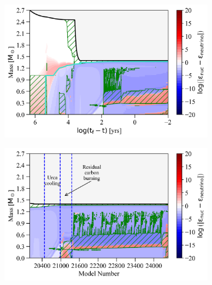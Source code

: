 \documentclass[main.tex]{subfiles}
\begin{document}
\begin{figure}[h!]
    \begin{subfigure}{.5\textwidth}
        \centering
        \includegraphics[width=0.95\columnwidth]{figures/chapter2/kipp/series2_rt_2p7M_eta0p8.png}
    \end{subfigure}\hfill
    \begin{subfigure}{.5\textwidth}
        \centering
        \includegraphics[width=0.95\columnwidth]{figures/chapter2/kipp/vs_model_number/series2_mn_2p7M_eta0p8.png}
    \end{subfigure}
    

\end{figure}
\end{document}
